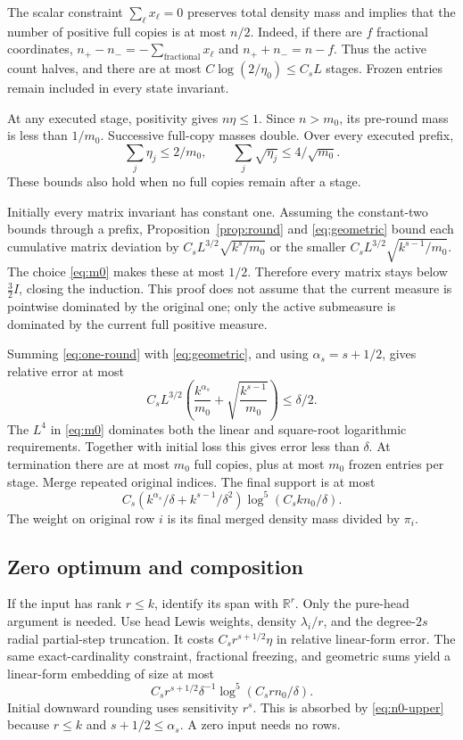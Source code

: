 \documentclass[11pt]{article}
\theoremstyle{remark}\newtheorem{remark}[theorem]{Remark}
\newcommand{\R}{\mathbb R}\newcommand{\E}{\mathbb E}\newcommand{\Prob}{\mathbb P}
\begin{document}
The scalar constraint $\sum_\ell x_\ell=0$ preserves total density mass and implies that the number of positive full copies is at most $n/2$. Indeed, if there are $f$ fractional coordinates, $n_+-n_-=-\sum_{\mathrm{fractional}}x_\ell$ and $n_++n_-=n-f$. Thus the active count halves, and there are at most $C\log(2/\eta_0)\le C_sL$ stages. Frozen entries remain included in every state invariant.

At any executed stage, positivity gives $n\eta\le1$. Since $n>m_0$, its pre-round mass is less than $1/m_0$. Successive full-copy masses double. Over every executed prefix,
\begin{equation}\label{eq:geometric}
 \sum_j\eta_j\le2/m_0,\qquad \sum_j\sqrt{\eta_j}\le4/\sqrt{m_0}.
\end{equation}
These bounds also hold when no full copies remain after a stage.

Initially every matrix invariant has constant one. Assuming the constant-two bounds through a prefix, Proposition~\ref{prop:round} and \eqref{eq:geometric} bound each cumulative matrix deviation by $C_sL^{3/2}\sqrt{k^s/m_0}$ or the smaller $C_sL^{3/2}\sqrt{k^{s-1}/m_0}$. The choice \eqref{eq:m0} makes these at most $1/2$. Therefore every matrix stays below $\frac32I$, closing the induction. This proof does not assume that the current measure is pointwise dominated by the original one; only the active submeasure is dominated by the current full positive measure.

Summing \eqref{eq:one-round} with \eqref{eq:geometric}, and using $\alpha_s=s+1/2$, gives relative error at most
\begin{equation}\label{eq:total-error}
 C_s L^{3/2}\left(\frac{k^{\alpha_s}}{m_0}+
 \sqrt{\frac{k^{s-1}}{m_0}}\right)\le\delta/2.
\end{equation}
The $L^4$ in \eqref{eq:m0} dominates both the linear and square-root logarithmic requirements. Together with initial loss this gives error less than $\delta$. At termination there are at most $m_0$ full copies, plus at most $m_0$ frozen entries per stage. Merge repeated original indices. The final support is at most
\begin{equation}\label{eq:n0-upper}
 C_s\left(k^{\alpha_s}/\delta+k^{s-1}/\delta^2\right)
 \log^5(C_s k n_0/\delta).
\end{equation}
The weight on original row $i$ is its final merged density mass divided by $\pi_i$.

\subsection{Zero optimum and composition}
If the input has rank $r\le k$, identify its span with $\R^r$. Only the pure-head argument is needed. Use head Lewis weights, density $\lambda_i/r$, and the degree-$2s$ radial partial-step truncation. It costs $C_s r^{s+1/2}\eta$ in relative linear-form error. The same exact-cardinality constraint, fractional freezing, and geometric sums yield a linear-form embedding of size at most
\[
 C_s r^{s+1/2}\delta^{-1}\log^5(C_srn_0/\delta).
\]
Initial downward rounding uses sensitivity $r^s$. This is absorbed by \eqref{eq:n0-upper} because $r\le k$ and $s+1/2\le\alpha_s$. A zero input needs no rows.
\end{document}
